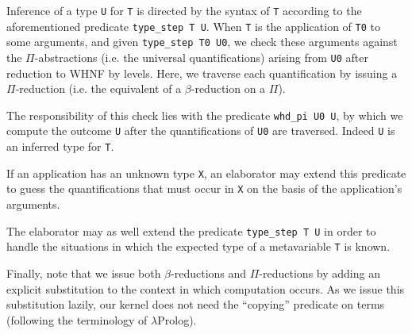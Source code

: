 Inference of a type \verb+U+ for \verb+T+ is directed by the syntax of \verb+T+
according to the aforementioned predicate \verb+type_step T U+.
When \verb+T+ is the application of \verb+T0+ to some arguments,
and given \verb+type_step T0 U0+,
we check these arguments against the $\Pi$-abstractions (i.e. the
universal quantifications) arising from \verb+U0+ after reduction to
WHNF by levels. Here, we traverse each quantification by issuing a $\Pi$-reduction
(i.e. the equivalent of a $\beta$-reduction on a $\Pi$).

The responsibility of this check lies with the predicate \verb+whd_pi U0 U+,
by which we compute the outcome \verb+U+ after the quantifications of
\verb+U0+ are traversed. Indeed \verb+U+ is an inferred type for \verb+T+.

If an application has an unknown type \verb+X+,
an elaborator may extend this predicate to guess the quantifications
that must occur in \verb+X+ on the basis of the application's arguments.

The elaborator may as well extend the predicate \verb+type_step T U+
in order to handle the situations in which
the expected type of a metavariable \verb+T+ is known.

Finally, note that we issue both $\beta$-reductions and $\Pi$-reductions
by adding an explicit substitution to the context in which computation occurs.
As we issue this substitution lazily,
our kernel does not need the ``copying'' predicate on terms
(following the terminology of $\lambda$Prolog).
